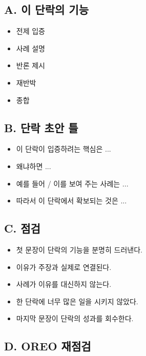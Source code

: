 \subsection{A. 이 단락의 기능}\label{a-uxc774-uxb2e8uxb77duxc758-uxae30uxb2a5}

\begin{itemize}
\tightlist
\item[$\square$]
  전제 입증
\item[$\square$]
  사례 설명
\item[$\square$]
  반론 제시
\item[$\square$]
  재반박
\item[$\square$]
  종합
\end{itemize}

\subsection{B. 단락 초안 틀}\label{b-uxb2e8uxb77d-uxcd08uxc548-uxd2c0}

\begin{itemize}
\tightlist
\item
  이 단락이 입증하려는 핵심은 ...
\item
  왜냐하면 ...
\item
  예를 들어 / 이를 보여 주는 사례는 ...
\item
  따라서 이 단락에서 확보되는 것은 ...
\end{itemize}

\subsection{C. 점검}\label{c-uxc810uxac80}

\begin{itemize}
\tightlist
\item[$\square$]
  첫 문장이 단락의 기능을 분명히 드러낸다.
\item[$\square$]
  이유가 주장과 실제로 연결된다.
\item[$\square$]
  사례가 이유를 대신하지 않는다.
\item[$\square$]
  한 단락에 너무 많은 일을 시키지 않았다.
\item[$\square$]
  마지막 문장이 단락의 성과를 회수한다.
\end{itemize}

\subsection{D. OREO 재점검}\label{d-oreo-uxc7acuxc810uxac80}

